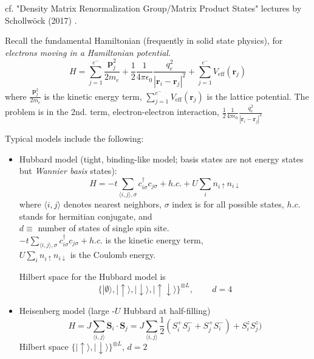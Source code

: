 cf. "Density Matrix Renormalization Group/Matrix Product States" lectures by Schollw\"{o}ck (2017) \cite{agat:ArSo2017}.

Recall the fundamental Hamiltonian (frequently in solid state physics), for \emph{electrons moving in a Hamiltonian potential}. 
\begin{equation}
H = \sum_{j=1}^{ e^-} \frac{\mathbf{p}_j^2}{ 2m_e} + \frac{1}{2} \frac{1}{ 4\pi \epsilon_0} \frac{q_e^2}{ |\mathbf{r}_i - \mathbf{r}_j|^2 } + \sum_{j=1}^{e^-} V_{\text{eff}}(\mathbf{r}_j)
\end{equation}
where $\frac{\mathbf{p}_j^2}{ 2m_e}$ is the kinetic energy term, $\sum_{j=1}^{e^-} V_{\text{eff}}(\mathbf{r}_j)$ is the lattice potential.
The problem is in the 2nd. term, electron-electron interaction, $\frac{1}{2} \frac{1}{ 4\pi \epsilon_0} \frac{q_e^2}{ |\mathbf{r}_i - \mathbf{r}_j|^2 }$

Typical models include the following:

\begin{itemize}
	\item Hubbard model (tight, binding-like model; basis states are not energy states but \emph{Wannier basis} states):
	\begin{equation}
	H = -t \sum_{ \langle i, j \rangle, \sigma } c^{\dag}_{i \sigma} c_{j \sigma} + h.c. + U \sum_i n_{i \uparrow} n_{i \downarrow }
	\end{equation}
	where $\langle i, j \rangle$ denotes nearest neighbors, $\sigma$ index is for all possible states, $h.c.$ stands for hermitian conjugate, and \\
	$d \equiv$ number of states of single spin site. \\
	$-t \sum_{ \langle i, j \rangle, \sigma } c^{\dag}_{i \sigma} c_{j \sigma} + h.c.$ is the kinetic energy term, \\
	$U \sum_i n_{i \uparrow} n_{i \downarrow }$ is the Coulomb energy.
	
	Hilbert space for the Hubbard model is 
	\begin{equation}
	\lbrace | \emptyset \rangle , | \uparrow \rangle , | \downarrow \rangle , | \uparrow \downarrow \rangle \rbrace^{ \otimes L}, \qquad \, d = 4
	\end{equation}
	\item Heisenberg model (large -$U$ Hubbard at half-filling)
	\begin{equation}
	H = J \sum_{ \langle i , j \rangle } \mathbf{S}_i \cdot \mathbf{S}_j = J \sum_{ \langle i, j \rangle } \frac{1}{2} (S_i^{+} S_j^- + S_j^{+} S_i^-) + S_i^z S_j^z  )
	\end{equation}
	Hilbert space $\lbrace | \uparrow \rangle, | \downarrow \rangle \rbrace^{\otimes L}$, $d=2$ 
\end{itemize}

